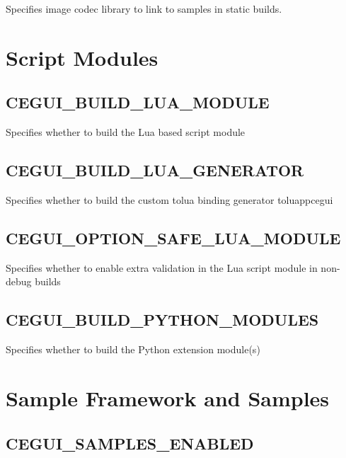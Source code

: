 Specifies image codec library to link to samples in static builds.\hypertarget{build_options_build_options_scripting}{}\section{Script Modules}\label{build_options_build_options_scripting}
\hypertarget{build_options_build_options_lua_module}{}\subsection{C\+E\+G\+U\+I\+\_\+\+B\+U\+I\+L\+D\+\_\+\+L\+U\+A\+\_\+\+M\+O\+D\+U\+LE}\label{build_options_build_options_lua_module}
Specifies whether to build the Lua based script module \hypertarget{build_options_build_options_lua_generator}{}\subsection{C\+E\+G\+U\+I\+\_\+\+B\+U\+I\+L\+D\+\_\+\+L\+U\+A\+\_\+\+G\+E\+N\+E\+R\+A\+T\+OR}\label{build_options_build_options_lua_generator}
Specifies whether to build the custom tolua binding generator \textquotesingle{}toluappcegui\textquotesingle{} \hypertarget{build_options_build_options_lua_safe_mode}{}\subsection{C\+E\+G\+U\+I\+\_\+\+O\+P\+T\+I\+O\+N\+\_\+\+S\+A\+F\+E\+\_\+\+L\+U\+A\+\_\+\+M\+O\+D\+U\+LE}\label{build_options_build_options_lua_safe_mode}
Specifies whether to enable extra validation in the Lua script module in non-\/debug builds \hypertarget{build_options_build_options_python_modules}{}\subsection{C\+E\+G\+U\+I\+\_\+\+B\+U\+I\+L\+D\+\_\+\+P\+Y\+T\+H\+O\+N\+\_\+\+M\+O\+D\+U\+L\+ES}\label{build_options_build_options_python_modules}
Specifies whether to build the Python extension module(s)\hypertarget{build_options_build_options_samples}{}\section{Sample Framework and Samples}\label{build_options_build_options_samples}
\hypertarget{build_options_build_options_samples_enabled}{}\subsection{C\+E\+G\+U\+I\+\_\+\+S\+A\+M\+P\+L\+E\+S\+\_\+\+E\+N\+A\+B\+L\+ED}\label{build_options_build_options_samples_enabled}
